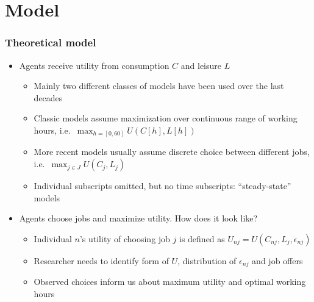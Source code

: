\documentclass[handout,intlimits]{beamer}
\def\litc#1{\textcolor{med-gray}{\tiny\citep{#1}}}
\def\blue#1{\textcolor{zewblue}{#1}}
\begin{document}
\section{Model}

\begin{frame}
\frametitle{Theoretical model}
\begin{itemize}
	\item \blue{Agents receive utility from consumption $C$ and leisure $L$}
	\begin{itemize}
		\item Mainly two different classes of models have been used over the last decades
		\smallskip
		\item Classic models assume maximization over continuous range of working hours, i.e.\ \blue{$\max_{h=[0,60]} U(C[h],L[h])$} \litc{burtless_hausman_1978, hausman_1981}
		\smallskip
		\item More recent models usually assume discrete choice between different jobs, i.e.\ \blue{$\max_{j\in J} U(C_j,L_j)$} \litc{aaberge_etal_1995, vansoest_1995, hoynes_1996}
		\smallskip
		\item Individual subscripts omitted, but no time subscripts: ``steady-state'' models
	\end{itemize}
	\bigskip
	\item \blue{Agents choose jobs and maximize utility.} How does it look like?
	\begin{itemize}
		\item Individual $n$'s utility of choosing job $j$ is defined as \blue{$U_{nj} = U\left(C_{nj},L_j,\epsilon_{nj}\right)$}
		\smallskip
		\item Researcher needs to identify form of $U$, distribution of $\epsilon_{nj}$ and job offers
		\smallskip
		\item Observed choices inform us about maximum utility and optimal working hours
	\end{itemize}
\end{itemize}
\end{frame}
\end{document}
